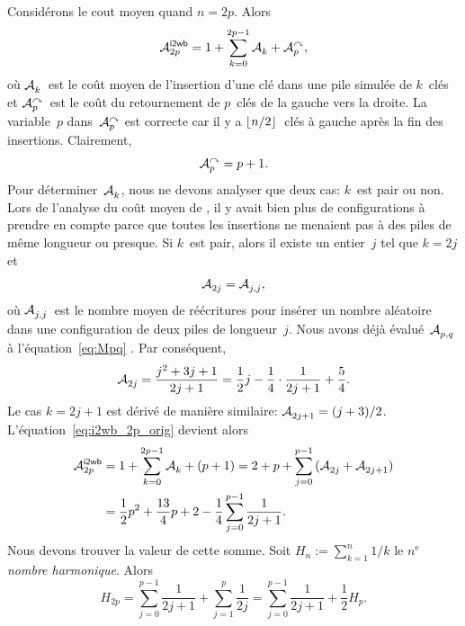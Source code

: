 Considérons le cout moyen quand \(n=2p\). Alors
\begin{equation}
  \M{\fun{i2wb}}{2p} = 1 + \sum_{k=0}^{2p-1}{\M{}{k}} + \M{\curvearrowright}{p},
  \label{eq:i2wb_2p_orig}
\end{equation}
où \(\M{}{k}\)~est le coût moyen de l'insertion d'une clé dans une
pile simulée de \(k\)~clés et
\(\M{\curvearrowright}{p}\)~est
le coût du retournement de \(p\)~clés de la gauche vers la droite. La
variable~\(p\) dans~\(\M{\curvearrowright}{p}\) est correcte car il y
a \(\floor{n/2}\)~clés à gauche après la fin des
insertions. Clairement,
\begin{equation*}
\M{\curvearrowright}{p} = p + 1.
\end{equation*}
Pour déterminer~\(\M{}{k}\), nous ne devons analyser que deux cas:
\(k\)~est pair ou non. Lors de l'analyse du coût moyen de ,
il y avait bien plus de configurations à prendre en compte parce que
toutes les insertions ne menaient pas à des piles de même longueur ou
presque. Si \(k\)~est pair, alors il existe un entier~\(j\) tel que
\(k=2j\) et
\begin{equation*}
\M{}{2j} = \M{}{j,j},
\end{equation*}
où \(\M{}{j,j}\)~est le nombre moyen de réécritures pour insérer un
nombre aléatoire dans une configuration de deux piles de
longueur~\(j\). Nous avons déjà évalué~\(\M{}{p,q}\) à
l'équation~\eqref{eq:Mpq} . Par conséquent,
\begin{equation*}
\M{}{2j} = \frac{j^2 + 3j + 1}{2j+1}
         = \frac{1}{2}{j} - \frac{1}{4} \cdot \frac{1}{2j+1} +
         \frac{5}{4}.
\end{equation*}
Le cas \(k=2j+1\) est dérivé de manière similaire: \(\M{}{2j+1} =
(j+3)/2\). L'équation~\eqref{eq:i2wb_2p_orig} devient alors
\begin{align}
\M{\fun{i2wb}}{2p}
  &= 1 + \sum_{k=0}^{2p-1}{\M{}{k}} + (p+1)
   = 2 + p + \sum_{j=0}^{p-1}{(\M{}{2j} + \M{}{2j+1})}\notag\\
  &= \frac{1}{2}{p^2} + \frac{13}{4}{p} + 2 -
             \frac{1}{4}\sum_{j=0}^{p-1}{\frac{1}{2j+1}}.
\label{eq:i2wb_2p}
\end{align}
Nous devons trouver la valeur de cette somme. Soit \(H_n :=
\sum_{k=1}^n{1/k}\) le \(n^\text{e}\) \emph{nombre
  harmonique}. Alors
\begin{equation*}
H_{2p} = \sum_{j=0}^{p-1}{\frac{1}{2j+1}} + \sum_{j=1}^{p}{\frac{1}{2j}}
      = \sum_{j=0}^{p-1}{\frac{1}{2j+1}} + \frac{1}{2}{H_{p}}.
\end{equation*}
